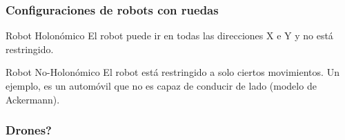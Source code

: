 \begin{frame}
    \frametitle{Configuraciones de robots con ruedas}

    \begin{figure}[!h]
        \centering
    \end{figure}
    
    \begin{block}{Robot Holonómico}
 		El robot puede ir en todas las direcciones X e Y y no está restringido.
    \end{block}
    
    \begin{block}{Robot No-Holonómico}
    	    El robot está restringido a solo ciertos movimientos. Un ejemplo, es un automóvil que no es capaz de conducir de lado (modelo de Ackermann).
    \end{block}
    
\end{frame}

\begin{frame}
    \frametitle{Drones?}

\end{frame}